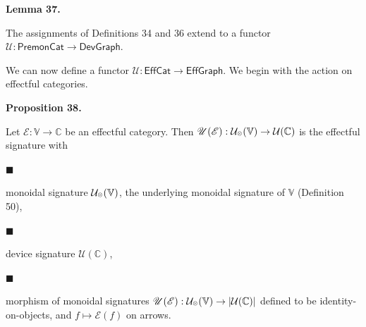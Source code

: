\documentclass[10pt,a4paper]{article}
\begin{document}
 
 
\par\medskip\noindent\textbf{Lemma 37.}\par
 
 
The assignments of Definitions 34 and 36 extend to a functor $\mathcal{U}:\mathsf{PremonCat}\to\mathsf{DevGraph}$.\par
 
 
 
 
We can now define a functor $\mathcal{U}:\mathsf{EffCat}\to\mathsf{EffGraph}$. We begin with the action on effectful categories.\par
 
 
 
\par\medskip\noindent\textbf{Proposition 38.}\par
 
 
Let $\mathscr{E}:\mathbb{V}\to\mathbb{C}$ be an effectful category. Then $\mathscr{U}(\mathscr{E}):\mathcal{U}_{\mathbin{\raisebox{1.25pt}{$\scriptscriptstyle\otimes$}}}(\mathbb{V})\to\mathcal{U}(\mathbb{C})$ is the effectful signature with\par
  
\par\noindent  $\blacksquare$ 
 
monoidal signature $\mathcal{U}_{\mathbin{\raisebox{1.25pt}{$\scriptscriptstyle\otimes$}}}(\mathbb{V})$, the underlying monoidal signature of $\mathbb{V}$ (Definition 50),\par
 
 
 
\par\noindent  $\blacksquare$ 
 
device signature $\mathcal{U}(\mathbb{C})$,\par
 
 
 
\par\noindent  $\blacksquare$ 
 
morphism of monoidal signatures $\mathscr{U}(\mathscr{E}):\mathcal{U}_{\mathbin{\raisebox{1.25pt}{$\scriptscriptstyle\otimes$}}}(\mathbb{V})\to|\mathcal{U}(\mathbb{C})|$ defined to be identity-on-objects, and $f\mapsto\mathscr{E}(f)$ on arrows.\par
 
\end{document}
